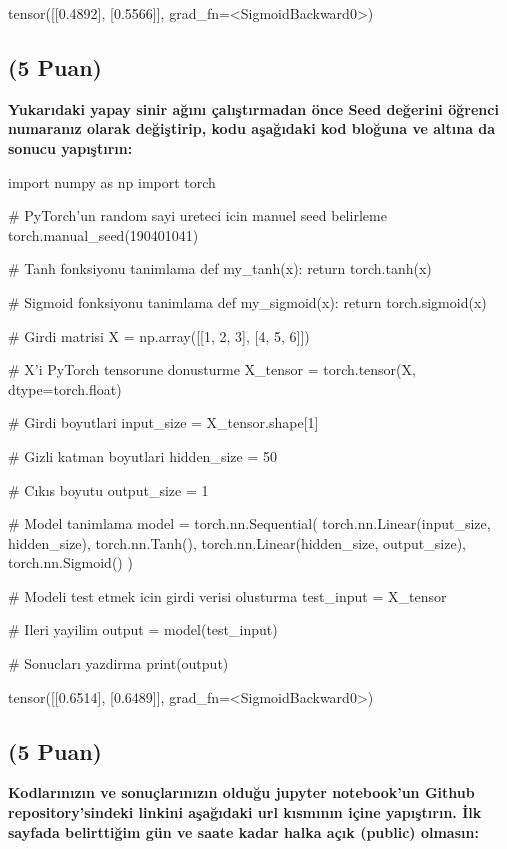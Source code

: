 \documentclass[11pt]{article}
\begin{document}
tensor([[0.4892],
        [0.5566]], grad\_fn=<SigmoidBackward0>)

\subsection{(5 Puan)} \textbf{Yukarıdaki yapay sinir ağını çalıştırmadan önce Seed değerini öğrenci numaranız olarak değiştirip, kodu aşağıdaki kod bloğuna ve altına da sonucu yapıştırın:}

\begin{python}
import numpy as np
import torch

# PyTorch'un random sayi ureteci icin manuel seed belirleme
torch.manual_seed(190401041)

# Tanh fonksiyonu tanimlama
def my_tanh(x):
    return torch.tanh(x)

# Sigmoid fonksiyonu tanimlama
def my_sigmoid(x):
    return torch.sigmoid(x)

# Girdi matrisi
X = np.array([[1, 2, 3],
              [4, 5, 6]])

# X'i PyTorch tensorune donusturme
X_tensor = torch.tensor(X, dtype=torch.float)

# Girdi boyutlari
input_size = X_tensor.shape[1]

# Gizli katman boyutlari
hidden_size = 50

# Cıkıs boyutu
output_size = 1

# Model tanimlama
model = torch.nn.Sequential(
    torch.nn.Linear(input_size, hidden_size),
    torch.nn.Tanh(),
    torch.nn.Linear(hidden_size, output_size),
    torch.nn.Sigmoid()
)

# Modeli test etmek icin girdi verisi olusturma
test_input = X_tensor

# Ileri yayilim
output = model(test_input)

# Sonucları yazdirma
print(output)

\end{python}

tensor([[0.6514],
        [0.6489]], grad\_fn=<SigmoidBackward0>)

\subsection{(5 Puan)} \textbf{Kodlarınızın ve sonuçlarınızın olduğu jupyter notebook'un Github repository'sindeki linkini aşağıdaki url kısmının içine yapıştırın. İlk sayfada belirttiğim gün ve saate kadar halka açık (public) olmasın:}
\end{document}
